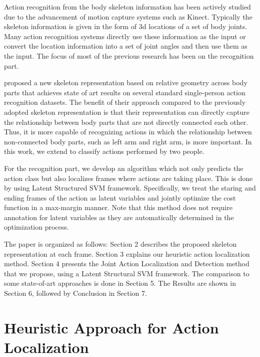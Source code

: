 \documentclass[10pt,twocolumn,letterpaper]{article}
\begin{document}
Action recognition from the body skeleton information has been actively studied due to the advancement of motion capture systems such as Kinect. Typically the skeleton information is given in the form of 3d locations of a set of body joints. Many action recognition systems directly use these information as the input or convert the location information into a set of joint angles and then use them as the input. The focus of most of the previous research has been on the recognition part. 

\cite{Vemulapalli2013} proposed a new skeleton representation based on relative geometry across body parts that achieves state of art results on several standard single-person action recognition datasets. The benefit of their approach compared to the previously adopted skeleton representation is that their representation can directly capture the relationship between body parts that are not directly connected each other. Thus, it is more capable of recognizing actions in which the relationship between non-connected body parts, such as left arm and right arm, is more important. In this work, we extend \cite{Vemulapalli2013} to classify actions performed by two people.


For the recognition part, we develop an algorithm which not only predicts the action class but also localizes frames where actions are taking place. This is done by using Latent Structured SVM framework. Specifically, we treat the staring and ending frames of the action as latent variables and jointly optimize the cost function in a max-margin manner. Note that this method does not require annotation for latent variables as they are automatically determined in the optimization process.


The paper is organized as follows: Section 2 describes the proposed skeleton representation at each frame. Section 3 explains our heuristic action localization method. Section 4 presents the Joint Action Localization and Detection method that we propose, using a Latent Structural SVM framework. The comparison to some state-of-art approaches is done in Section 5. The Results are shown in Section 6, followed by Conclusion in Section 7.


\section{Heuristic Approach for Action Localization}\label{sec:actionlocalization}
\end{document}

